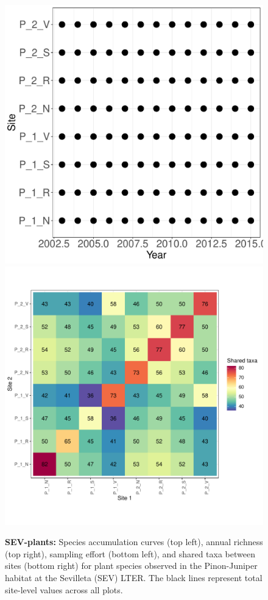 \documentclass[11pt, oneside]{article}
\begin{document}
\begin{figure}[h!]
\includegraphics[scale = 0.4]{sev-plants-compagnoni_spatiotemporal_sampling_effort.pdf}
\includegraphics[scale = 0.4]{sev-plants-compagnoni_spp_shared.pdf}
\caption{{\bf SEV-plants:} Species accumulation curves (top left),  annual richness (top right), sampling effort (bottom left), and shared taxa between sites (bottom right) for plant species observed in the Pinon-Juniper habitat at the Sevilleta  (SEV) LTER. The black lines represent total site-level values across all plots.}
\label{sev-plants}
\end{figure}
\end{document}
